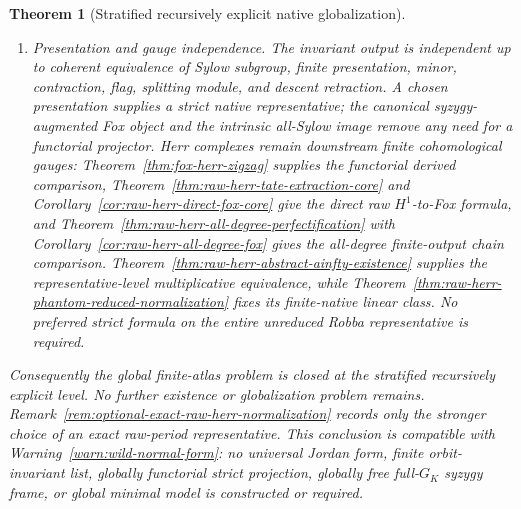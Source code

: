 \documentclass[11pt]{article}
\newtheorem{theorem}{Theorem}[section]
\theoremstyle{definition}
\begin{document}
\begin{theorem}[Stratified recursively explicit native globalization]
\begin{enumerate}[label=\textnormal{(\roman*)}]
\item \emph{Presentation and gauge independence.}  The invariant output is independent up to coherent equivalence of Sylow subgroup, finite presentation, minor, contraction, flag, splitting module, and descent retraction.  A chosen presentation supplies a strict native representative; the canonical syzygy-augmented Fox object and the intrinsic all-Sylow image remove any need for a functorial projector.  Herr complexes remain downstream finite cohomological gauges: Theorem~\ref{thm:fox-herr-zigzag} supplies the functorial derived comparison, Theorem~\ref{thm:raw-herr-tate-extraction-core} and Corollary~\ref{cor:raw-herr-direct-fox-core} give the direct raw $H^1$-to-Fox formula, and Theorem~\ref{thm:raw-herr-all-degree-perfectification} with Corollary~\ref{cor:raw-herr-all-degree-fox} gives the all-degree finite-output chain comparison.  Theorem~\ref{thm:raw-herr-abstract-ainfty-existence} supplies the representative-level multiplicative equivalence, while Theorem~\ref{thm:raw-herr-phantom-reduced-normalization} fixes its finite-native linear class.  No preferred strict formula on the entire unreduced Robba representative is required.
\end{enumerate}
Consequently the global finite-atlas problem is closed at the stratified recursively explicit level.  No further existence or globalization problem remains.  Remark~\ref{rem:optional-exact-raw-herr-normalization} records only the stronger choice of an exact raw-period representative.  This conclusion is compatible with Warning~\ref{warn:wild-normal-form}: no universal Jordan form, finite orbit-invariant list, globally functorial strict projection, globally free full-$G_K$ syzygy frame, or global minimal model is constructed or required.
\end{theorem}
\end{document}

